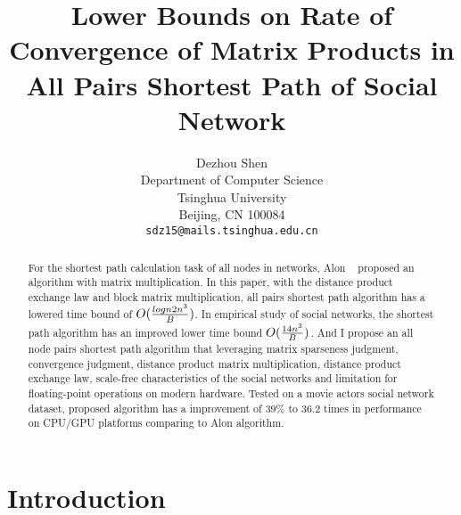 \documentclass[review]{cvpr}
\begin{document}
\title{Lower Bounds on Rate of Convergence of Matrix Products in All Pairs Shortest Path of Social Network}

\author{Dezhou Shen\\
Department of Computer Science\\
Tsinghua University\\
Beijing, CN 100084\\
{\tt\small sdz15@mails.tsinghua.edu.cn}
}

\maketitle


\begin{abstract}
  For the shortest path calculation task of all nodes in networks, Alon \etal ~\cite{alon1997exponent} proposed an algorithm with matrix multiplication.
  In this paper, with the distance product exchange law and block matrix multiplication, all pairs shortest path algorithm has a lowered time bound of \(O({logn2n^3\over B})\).
  In empirical study of social networks, the shortest path algorithm has an improved lower time bound \(O({14n^3 \over B})\).
  And I propose an all node pairs shortest path algorithm that leveraging matrix sparseness judgment, convergence judgment, distance product matrix multiplication, distance product exchange law,
  scale-free characteristics of the social networks and limitation for floating-point operations on modern hardware.
  Tested on a movie actors social network dataset, proposed algorithm has a improvement of 39\% to 36.2 times in performance on CPU/GPU platforms comparing to Alon \etal algorithm.
\end{abstract}

\section{Introduction}
\end{document}
